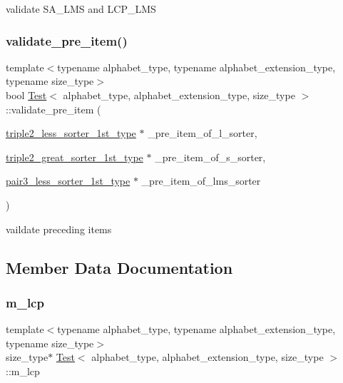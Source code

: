 validate S\+A\+\_\+\+L\+MS and L\+C\+P\+\_\+\+L\+MS 

\mbox{\label{class_test_aed94eee4f2a73d02c0abbe448efe2095}} 
\subsubsection{\texorpdfstring{validate\+\_\+pre\+\_\+item()}{validate\_pre\_item()}}
{\footnotesize\ttfamily template$<$typename alphabet\+\_\+type, typename alphabet\+\_\+extension\+\_\+type, typename size\+\_\+type$>$ \\
bool \hyperlink{class_test}{Test}$<$ alphabet\+\_\+type, alphabet\+\_\+extension\+\_\+type, size\+\_\+type $>$\+::validate\+\_\+pre\+\_\+item (\begin{DoxyParamCaption}\item[{\hyperlink{class_test_a1e7fba953871f5eee60eabf8b0e287b7}{triple2\+\_\+less\+\_\+sorter\+\_\+1st\+\_\+type} $\ast$}]{\+\_\+pre\+\_\+item\+\_\+of\+\_\+l\+\_\+sorter,  }\item[{\hyperlink{class_test_ad87ac75730f80ef0824f0c56ec7db12d}{triple2\+\_\+great\+\_\+sorter\+\_\+1st\+\_\+type} $\ast$}]{\+\_\+pre\+\_\+item\+\_\+of\+\_\+s\+\_\+sorter,  }\item[{\hyperlink{class_test_aa25f2080d593eb18d6e5e475d99bac17}{pair3\+\_\+less\+\_\+sorter\+\_\+1st\+\_\+type} $\ast$}]{\+\_\+pre\+\_\+item\+\_\+of\+\_\+lms\+\_\+sorter }\end{DoxyParamCaption})\hspace{0.3cm}{\ttfamily [inline]}}



vaildate preceding items 



\subsection{Member Data Documentation}
\mbox{\label{class_test_aba44b9a05184fb5f62f4901fd607da40}} 
\subsubsection{\texorpdfstring{m\+\_\+lcp}{m\_lcp}}
{\footnotesize\ttfamily template$<$typename alphabet\+\_\+type, typename alphabet\+\_\+extension\+\_\+type, typename size\+\_\+type$>$ \\
size\+\_\+type$\ast$ \hyperlink{class_test}{Test}$<$ alphabet\+\_\+type, alphabet\+\_\+extension\+\_\+type, size\+\_\+type $>$\+::m\+\_\+lcp\hspace{0.3cm}{\ttfamily [private]}}

